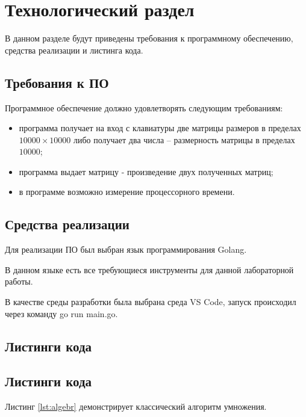\chapter{Технологический раздел}

В данном разделе будут приведены требования к программному обеспечению, средства реализации и листинга кода.

\section{Требования к ПО}

Программное обеспечение должно удовлетворять следующим требованиям:
\begin{itemize}
	\item программа получает на вход с клавиатуры две матрицы размеров в пределах $10000 \times 10000$ либо получает два числа -- размерность матрицы в пределах $10000$;
	\item программа выдает матрицу - произведение двух полученных матриц;
	\item в программе возможно измерение процессорного времени.
\end{itemize}

\section{Средства реализации} 
Для реализации ПО был выбран язык программирования Golang\cite{golang}. 

В данном языке есть все требующиеся инструменты для данной лабораторной работы.

В качестве среды разработки была выбрана среда VS Code\cite{rune}, запуск происходил через команду go run main.go.

\section{Листинги кода}

\section{Листинги кода}
Листинг \ref{lst:algebr} демонстрирует классический алгоритм умножения. 
\newpage

